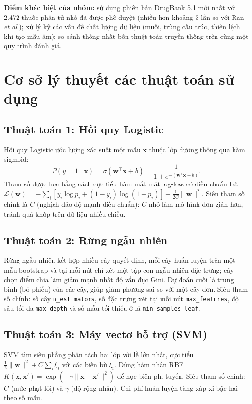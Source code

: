 \documentclass[12pt,a4paper,oneside]{report}
\begin{document}
\textbf{Điểm khác biệt của nhóm:} sử dụng phiên bản DrugBank 5.1 mới nhất với
2.472 thuốc phân tử nhỏ đã được phê duyệt (nhiều hơn khoảng 3 lần so với Ran
\textit{et al.}); xử lý kỹ các vấn đề chất lượng dữ liệu (muối, trùng cấu trúc,
thiên lệch khi tạo mẫu âm); so sánh thống nhất bốn thuật toán truyền thống trên
cùng một quy trình đánh giá.

\section{Cơ sở lý thuyết các thuật toán sử dụng}

\subsection{Thuật toán 1: Hồi quy Logistic}
Hồi quy Logistic ước lượng xác suất một mẫu $\mathbf{x}$ thuộc lớp dương
thông qua hàm sigmoid:
\begin{equation}
  P(y=1 \mid \mathbf{x}) = \sigma(\mathbf{w}^{\top}\mathbf{x}+b)
  = \frac{1}{1+e^{-(\mathbf{w}^{\top}\mathbf{x}+b)}}.
  \label{eq:sigmoid}
\end{equation}
Tham số được học bằng cách cực tiểu hàm mất mát log-loss có điều chuẩn L2:
$\mathcal{L}(\mathbf{w}) = -\sum_i\left[y_i\log p_i+(1-y_i)\log(1-p_i)\right]+\frac{1}{2C}\lVert\mathbf{w}\rVert^2$.
Siêu tham số chính là $C$ (nghịch đảo độ mạnh điều chuẩn): $C$ nhỏ làm mô hình
đơn giản hơn, tránh quá khớp trên dữ liệu nhiều chiều.

\subsection{Thuật toán 2: Rừng ngẫu nhiên}
Rừng ngẫu nhiên \cite{breiman2001} kết hợp nhiều cây quyết định, mỗi cây huấn
luyện trên một mẫu bootstrap và tại mỗi nút chỉ xét một tập con ngẫu nhiên đặc
trưng; cây chọn điểm chia làm giảm mạnh nhất độ vẩn đục Gini. Dự đoán cuối là
trung bình (bỏ phiếu) của các cây, giúp giảm phương sai so với một cây đơn. Siêu
tham số chính: số cây \texttt{n\_estimators}, số đặc trưng xét tại mỗi nút
\texttt{max\_features}, độ sâu tối đa \texttt{max\_depth} và số mẫu tối thiểu ở
lá \texttt{min\_samples\_leaf}.

\subsection{Thuật toán 3: Máy vectơ hỗ trợ (SVM)}
SVM \cite{cortes1995} tìm siêu phẳng phân tách hai lớp với lề lớn nhất, cực tiểu
$\frac{1}{2}\lVert\mathbf{w}\rVert^2 + C\sum_i\xi_i$ với các biến bù $\xi_i$. Dùng
hàm nhân RBF $K(\mathbf{x},\mathbf{x}')=\exp(-\gamma\lVert\mathbf{x}-\mathbf{x}'\rVert^2)$
để học biên phi tuyến. Siêu tham số chính: $C$ (mức phạt lỗi) và $\gamma$ (độ
rộng nhân). Chi phí huấn luyện tăng xấp xỉ bậc hai theo số mẫu.
\end{document}

